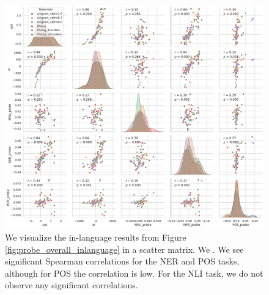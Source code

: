 \begin{figure}
    \centering
    \includegraphics[width=\textwidth]{figures/probe_detailed_inlanguage_scattermatrix.pdf}
    \caption{We visualize the in-language results from Figure \ref{fig:probe_overall_inlanguage} in a scatter matrix. We . We see significant Spearman correlations for the NER and POS tasks, although for POS the correlation is low. For the NLI task, we do not observe any significant correlations.}
    \label{fig:probe_overall_inlanguage_scattermatrix}
\end{figure}

